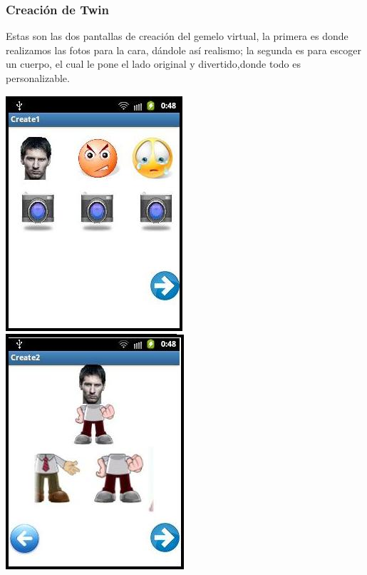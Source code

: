 \documentclass[10pt]{article}
\begin{document}
{\begin{flushleft}
\subsubsection{Creaci\'on de Twin}
Estas son las dos pantallas de creaci\'on del gemelo virtual, la primera es donde realizamos las fotos para la cara, d\'andole as\'i realismo; la segunda es para escoger un cuerpo, el cual le pone el lado original y divertido,donde todo es personalizable. \\
\begin{center}
\vspace{0.1in}
\includegraphics[scale=0.65]{create1.jpg}
\hspace{0.4in}\includegraphics[scale=0.65]{create2.jpg}
\end{center}


\newpage

\end{flushleft}}
\end{document}
